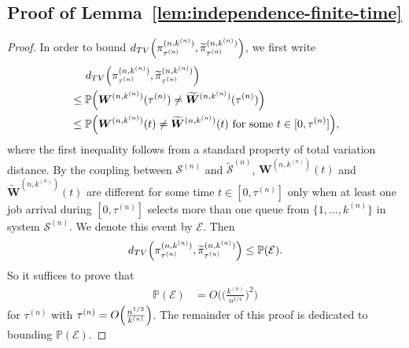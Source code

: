 \documentclass[sigconf]{acmart}
\renewcommand{\Pr}{\mathbb{P}} %
\newcommand{\supn}{^{(n)}}
\begin{document}
\subsection*{\normalsize{Proof of Lemma~\ref{lem:independence-finite-time}}}
\begin{proof}
In order to bound $d_{TV}\Bigl(\pi_{\tau\supn}^{(n,k\supn)},\widetilde{\pi}_{\tau\supn}^{(n,k\supn)}\Bigr)$, we first write
\begin{align*}
&\mspace{25mu}d_{TV}\Bigl(\pi_{\tau\supn}^{(n,k\supn)},\widetilde{\pi}_{\tau\supn}^{(n,k\supn)}\Bigr)\\
&\le\Pr\Bigl(\bm{W}^{(n,k\supn)}(\tau\supn)\neq\widetilde{\bm{W}}^{(n,k\supn)}(\tau\supn)\Bigr)\\
&\le \Pr\Bigl(\bm{W}^{(n,k\supn)}(t)\neq\widetilde{\bm{W}}^{(n,k\supn)}(t)\text{ for some }t\in[0,\tau\supn]\Bigr),
\end{align*}
where the first inequality follows from a standard property of total variation distance.
By the coupling between $\mathcal{S}\supn$ and $\widetilde{\mathcal{S}}\supn$, $\bm{W}^{(n,k\supn)}(t)$ and $\widetilde{\bm{W}}^{(n,k\supn)}(t)$ are different for some time $t\in[0,\tau\supn]$ only when at least one job arrival during $[0,\tau\supn]$ selects more than one queue from $\bigl\{1,\dots,k\supn\bigr\}$ in system $\mathcal{S}\supn$.  We denote this event by $\mathcal{E}$.  Then
\begin{equation*}
d_{TV}\Bigl(\pi_{\tau\supn}^{(n,k\supn)},\widetilde{\pi}_{\tau\supn}^{(n,k\supn)}\Bigr)\le \Pr(\mathcal{E}).
\end{equation*}
So it suffices to prove that
\begin{align*}
\Pr(\mathcal{E})
&=O\Biggl(\biggl(\frac{k\supn}{n^{1/4}}\biggr)^2\Biggr)
\end{align*}
for $\tau\supn$ with $\tau\supn=O\Bigl(\frac{n^{1/2}}{k\supn}\Bigr)$.  The remainder of this proof is dedicated to bounding $\Pr(\mathcal{E})$. 



\end{proof}
\end{document}
